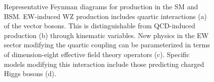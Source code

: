 \begin{figure}[htbp]
  \centering
   \qquad
   \qquad
   \qquad
   \qquad
  \caption{Representative Feynman diagrams for \WZjj production in the SM and BSM. 
  EW-induced WZ production includes quartic interactions (a) of the vector bosons.
  This is distinguishable from QCD-induced production (b) through kinematic variables.
  New physics in the EW sector modifying the quartic coupling 
  can be parameterized in terms of dimension-eight effective field theory operators (c).
  Specific models modifying this interaction include those predicting charged Higgs bosons (d).
  }
 \label{fig:feynmanDiagrams}
\end{figure}


